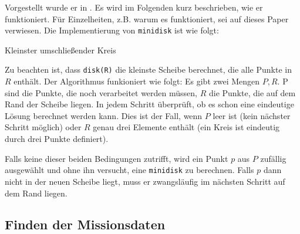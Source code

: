 \documentclass{article}
\begin{document}
Vorgestellt wurde er in \cite{welzl91}. Es wird im Folgenden kurz beschrieben, wie er funktioniert. Für Einzelheiten, z.B. 
warum es funktioniert, sei auf dieses Paper verwiesen. Die Implementierung von \texttt{minidisk} ist wie folgt:

\begin{algorithm}[H]
    \caption{Kleinster umschließender Kreis}

    \BlankLine
    
\end{algorithm} 

Zu beachten ist, dass \texttt{disk(R)} die kleinste Scheibe berechnet, die alle Punkte in $R$ enthält. Der Algorithmus funkioniert wie folgt:
Es gibt zwei Mengen $P,R$. P sind die Punkte, die noch verarbeitet werden müssen, $R$ die Punkte, die auf dem Rand der Scheibe liegen. In jedem
Schritt überprüft, ob es schon eine eindeutige Lösung berechnet werden kann. Dies ist der Fall, wenn $P$ leer ist (kein nächster Schritt möglich) oder $R$ genau drei Elemente enthält (ein Kreis ist eindeutig durch drei Punkte definiert). 

Falls keine dieser beiden Bedingungen zutrifft, wird ein Punkt $p$ aus $P$ zufällig ausgewählt und ohne ihn versucht, eine \texttt{minidisk} zu berechnen. Falls $p$  dann nicht in der neuen Scheibe liegt, muss er zwangsläufig im nächsten Schritt auf dem Rand liegen.

\subsection{Finden der Missionsdaten}
\end{document}
